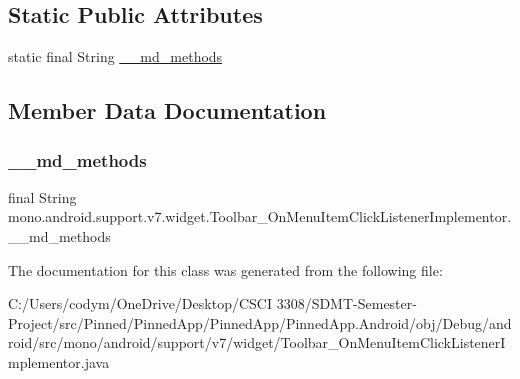 \subsection*{Static Public Attributes}
\begin{DoxyCompactItemize}
\item 
static final String \hyperlink{classmono_1_1android_1_1support_1_1v7_1_1widget_1_1_toolbar___on_menu_item_click_listener_implementor_ae2a6ab2c5121d74c0a12e594c68ddb43}{\+\_\+\+\_\+md\+\_\+methods}
\end{DoxyCompactItemize}


\subsection{Member Data Documentation}
\mbox{\label{classmono_1_1android_1_1support_1_1v7_1_1widget_1_1_toolbar___on_menu_item_click_listener_implementor_ae2a6ab2c5121d74c0a12e594c68ddb43}} 
\subsubsection{\texorpdfstring{\+\_\+\+\_\+md\+\_\+methods}{\_\_md\_methods}}
{\footnotesize\ttfamily final String mono.\+android.\+support.\+v7.\+widget.\+Toolbar\+\_\+\+On\+Menu\+Item\+Click\+Listener\+Implementor.\+\_\+\+\_\+md\+\_\+methods\hspace{0.3cm}{\ttfamily [static]}}



The documentation for this class was generated from the following file\+:\begin{DoxyCompactItemize}
\item 
C\+:/\+Users/codym/\+One\+Drive/\+Desktop/\+C\+S\+C\+I 3308/\+S\+D\+M\+T-\/\+Semester-\/\+Project/src/\+Pinned/\+Pinned\+App/\+Pinned\+App/\+Pinned\+App.\+Android/obj/\+Debug/android/src/mono/android/support/v7/widget/Toolbar\+\_\+\+On\+Menu\+Item\+Click\+Listener\+Implementor.\+java\end{DoxyCompactItemize}
